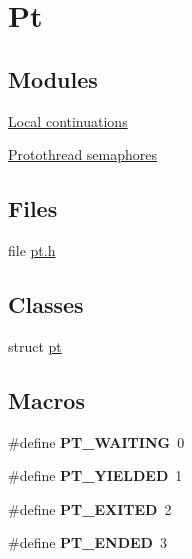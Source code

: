 \hypertarget{group__pt}{\section{Pt}
\label{group__pt}
}
\subsection*{Modules}
\begin{DoxyCompactItemize}
\item 
\hyperlink{group__lc}{Local continuations}
\item 
\hyperlink{group__ptsem}{Protothread semaphores}
\end{DoxyCompactItemize}
\subsection*{Files}
\begin{DoxyCompactItemize}
\item 
file \hyperlink{pt_8h}{pt.\-h}
\end{DoxyCompactItemize}
\subsection*{Classes}
\begin{DoxyCompactItemize}
\item 
struct \hyperlink{structpt}{pt}
\end{DoxyCompactItemize}
\subsection*{Macros}
\begin{DoxyCompactItemize}
\item 
\hypertarget{group__pt_ga7b5319b5b65761a845fcd1500fde4cdc}{\#define {\bfseries P\-T\-\_\-\-W\-A\-I\-T\-I\-N\-G}~0}\label{group__pt_ga7b5319b5b65761a845fcd1500fde4cdc}

\item 
\hypertarget{group__pt_gae469332907e0617d72d5e2dd4297119d}{\#define {\bfseries P\-T\-\_\-\-Y\-I\-E\-L\-D\-E\-D}~1}\label{group__pt_gae469332907e0617d72d5e2dd4297119d}

\item 
\hypertarget{group__pt_gacfae9053e5c107a1aed6b228c917d2ea}{\#define {\bfseries P\-T\-\_\-\-E\-X\-I\-T\-E\-D}~2}\label{group__pt_gacfae9053e5c107a1aed6b228c917d2ea}

\item 
\hypertarget{group__pt_ga9ff1e8936a8a26bff54c05f8a989b93b}{\#define {\bfseries P\-T\-\_\-\-E\-N\-D\-E\-D}~3}\label{group__pt_ga9ff1e8936a8a26bff54c05f8a989b93b}

\end{DoxyCompactItemize}
